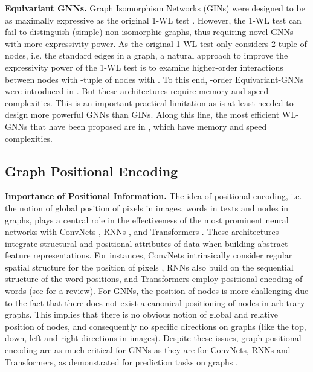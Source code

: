 \documentclass{article} \usepackage{iclr2021_conference,times}
\begin{document}
{\bf Equivariant GNNs.} Graph Isomorphism Networks (GINs) \citep{xu2018how} were designed to be as maximally expressive as the original 1-WL test \citep{weisfeiler1968reduction}. However, the 1-WL test can fail to distinguish (simple) non-isomorphic graphs, thus requiring novel GNNs with more expressivity power. As the original 1-WL test only considers 2-tuple of nodes, i.e. the standard edges in a graph, a natural approach to improve the expressivity power of the 1-WL test is to examine higher-order interactions between nodes with -tuple of nodes with . To this end, -order Equivariant-GNNs were introduced in \cite{maron2018invariant}. But these architectures require  memory and speed complexities. This is an important practical limitation as  is at least needed to design more powerful GNNs than GINs. Along this line, the most efficient WL-GNNs that have been proposed are in \cite{maron2019provably,chen2019equivalence,azizian2020expressive}, which have  memory and  speed complexities.






\subsection{Graph Positional Encoding}
\label{sec:related_work_graphpe}

{\bf Importance of Positional Information.} The idea of positional encoding, i.e. the notion of global position of pixels in images, words in texts and nodes in graphs, plays a central role in the effectiveness of the most prominent neural networks with ConvNets \citep{lecun1998gradient}, RNNs \citep{hochreiter1997long}, and Transformers \citep{vaswani2017attention}. These architectures integrate structural and positional attributes of data when building abstract feature representations. For instances, ConvNets intrinsically consider regular spatial structure for the position of pixels \citep{Islam2020How}, RNNs also build on the sequential structure of the word positions, and Transformers employ positional encoding of words (see \cite{dufter2021position} for a review). For GNNs, the position of nodes is more challenging due to the fact that there does not exist a canonical positioning of nodes in arbitrary graphs. This implies that there is no obvious notion of global and relative position of nodes, and consequently no specific directions on graphs (like the top, down, left and right directions in images). Despite these issues, graph positional encoding are as much critical for GNNs as they are for ConvNets, RNNs and Transformers, as demonstrated for prediction tasks on graphs \citep{srinivasan2019equivalence, cui2021positional}. 
\end{document}
